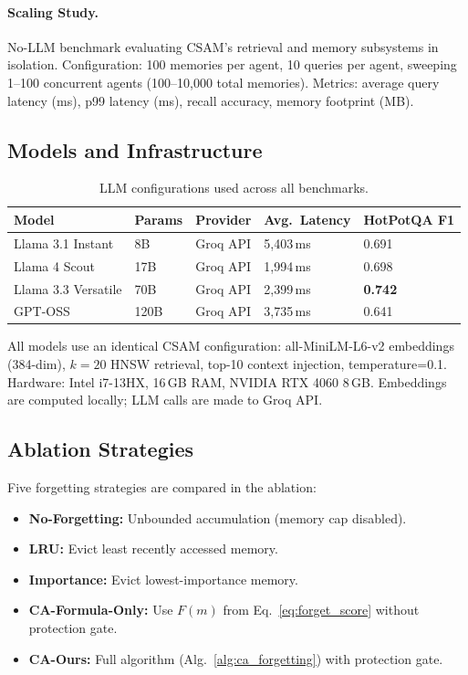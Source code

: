 \documentclass{article}
\begin{document}
\paragraph{Scaling Study.}
No-LLM benchmark evaluating CSAM's retrieval and memory subsystems in
isolation.  Configuration: 100 memories per agent, 10 queries per agent,
sweeping 1–100 concurrent agents (100–10,000 total memories).  Metrics:
average query latency (ms), p99 latency (ms), recall accuracy, memory footprint (MB).

\subsection{Models and Infrastructure}

\begin{table}[h]
\centering
\caption{LLM configurations used across all benchmarks.}
\label{tab:models}
\begin{tabular}{lllll}
\toprule
Model & Params & Provider & Avg.\ Latency & HotPotQA F1 \\
\midrule
Llama 3.1 Instant  & 8B   & Groq API & 5,403\,ms & 0.691 \\
Llama 4 Scout      & 17B  & Groq API & 1,994\,ms & 0.698 \\
Llama 3.3 Versatile& 70B  & Groq API & 2,399\,ms & \textbf{0.742} \\
GPT-OSS            & 120B & Groq API & 3,735\,ms & 0.641 \\
\bottomrule
\end{tabular}
\end{table}

All models use an identical CSAM configuration: all-MiniLM-L6-v2 embeddings
(384-dim), $k=20$ HNSW retrieval, top-10 context injection, temperature=0.1.
Hardware: Intel i7-13HX, 16\,GB RAM, NVIDIA RTX 4060 8\,GB.  Embeddings are
computed locally; LLM calls are made to Groq API.

\subsection{Ablation Strategies}

Five forgetting strategies are compared in the ablation:

\begin{itemize}
\item \textbf{No-Forgetting:} Unbounded accumulation (memory cap disabled).
\item \textbf{LRU:} Evict least recently accessed memory.
\item \textbf{Importance:} Evict lowest-importance memory.
\item \textbf{CA-Formula-Only:} Use $F(m)$ from Eq.~\ref{eq:forget_score} without protection gate.
\item \textbf{CA-Ours:} Full algorithm (Alg.~\ref{alg:ca_forgetting}) with protection gate.
\end{itemize}
\end{document}
